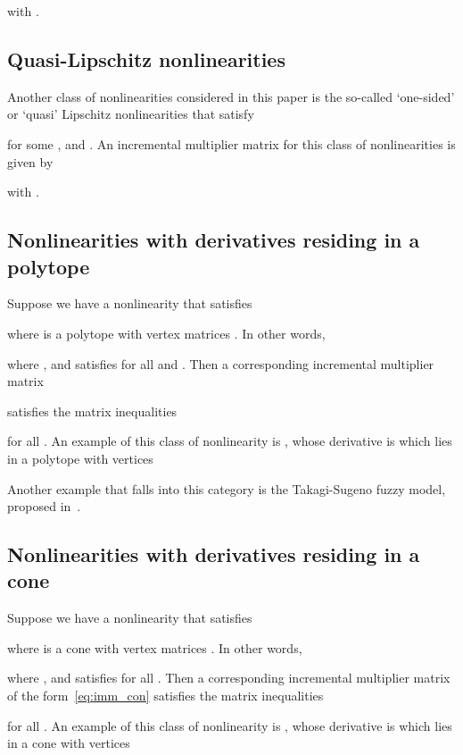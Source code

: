 \documentclass[times, doublespace]{rncauth}
\begin{document}
with .
\subsection{Quasi-Lipschitz nonlinearities}
Another class of nonlinearities considered in this paper is the so-called `one-sided' or `quasi' Lipschitz nonlinearities that satisfy

for some ,  and . An incremental multiplier matrix for this class of nonlinearities is given by

with .
\subsection{Nonlinearities with derivatives residing in a polytope}
Suppose we have a nonlinearity  that satisfies

where  is a polytope with vertex matrices . In other words, 

where , and  satisfies  for all  and . Then a corresponding incremental multiplier matrix

satisfies the matrix inequalities

for all . An example of this class of nonlinearity is , whose derivative is  which lies in a polytope  with vertices

Another example that falls into this category is the Takagi-Sugeno fuzzy model, proposed in~\cite{Sugeno1985}.
\subsection{Nonlinearities with derivatives residing in a cone}
Suppose we have a nonlinearity  that satisfies

where  is a cone with vertex matrices . In other words, 

where , and  satisfies  for all . Then a corresponding incremental multiplier matrix of the form~\eqref{eq:imm_con} satisfies the matrix inequalities

for all . An example of this class of nonlinearity is , whose derivative is  which lies in a cone  with vertices
\end{document}
